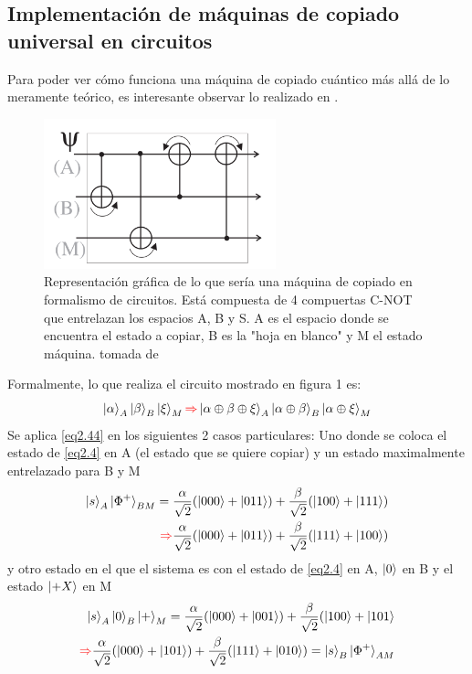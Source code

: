\documentclass{book}
\begin{document}
\subsection{Implementación de máquinas de copiado universal en circuitos}
Para poder ver cómo funciona una máquina de copiado cuántico más allá de lo meramente teórico, es interesante observar lo realizado en \cite{bib3}. 
\begin{figure}[ht][ht]
\label{cir1}
\includegraphics[width=0.6\textwidth]{circuito.png}
\caption{Representación gráfica de lo que sería una máquina de copiado en formalismo de circuitos. Está compuesta de 4 compuertas C-NOT que entrelazan los espacios A, B y S. A es el espacio donde se encuentra el estado a copiar, B es la "hoja en blanco" y M el estado máquina. tomada de \cite{bib3} }
\end{figure}
Formalmente, lo que realiza el circuito mostrado en figura 1 es:
\begin{equation}\label{eq2.44}{ \ket{\alpha}_A\ket{\beta}_B\ket{\xi}_M\textcolor{red}{\Rightarrow}\ket{\alpha\oplus\beta\oplus\xi}_A\ket{\alpha\oplus\beta}_B\ket{\alpha\oplus\xi}_M}\end{equation}
Se aplica \ref{eq2.44} en los siguientes 2 casos particulares: Uno donde se coloca el estado de \ref{eq2.4} en A (el estado que se quiere copiar) y un estado maximalmente entrelazado para B y M
\begin{equation}\label{eq2.45} \begin{aligned} {\ket{s}_A\ket{\Phi^+}_{BM}=\frac{\alpha}{\sqrt{2}}(\ket{000}+\ket{011})+\frac{\beta}{\sqrt{2}}(\ket{100}+\ket{111})} \\ {\textcolor{red}{\Rightarrow} \frac{\alpha}{\sqrt{2}}(\ket{000}+\ket{011})+\frac{\beta}{\sqrt{2}}(\ket{111}+\ket{100})}\end{aligned} \end{equation}
y otro estado en el que el sistema es con el estado de \ref{eq2.4} en A, $\ket{0}$ en B y el estado $\ket{+X}$ en M 
\begin{equation}\label{eq2.46} \begin{aligned}{\ket{s}_A\ket{0}_B\ket{+}_M=\frac{\alpha}{\sqrt{2}}(\ket{000}+\ket{001})+\frac{\beta}{\sqrt{2}}(\ket{100}+\ket{101}}\\ {\textcolor{red}{\Rightarrow} \frac{\alpha}{\sqrt{2}}(\ket{000}+\ket{101})+\frac{\beta}{\sqrt{2}}(\ket{111}+\ket{010})=\ket{s}_B\ket{\Phi^+}_{AM}}\end{aligned}\end{equation}
\end{document}
